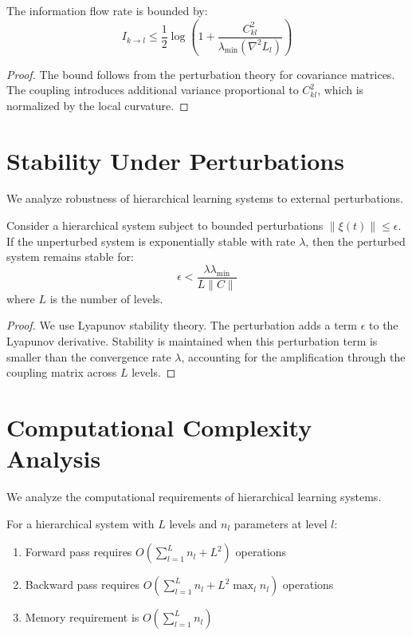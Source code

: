 \begin{theorem}
\label{thm:information_flow_bounds}
The information flow rate is bounded by:
$$I_{k \to l} \leq \frac{1}{2}\log\left(1 + \frac{C_{kl}^2}{\lambda_{\min}(\nabla^2 L_l)}\right)$$
\end{theorem}

\begin{proof}
The bound follows from the perturbation theory for covariance matrices. The coupling introduces additional variance proportional to $C_{kl}^2$, which is normalized by the local curvature.
\end{proof}

\section{Stability Under Perturbations}

We analyze robustness of hierarchical learning systems to external perturbations.

\begin{theorem}
\label{thm:perturbation_stability}
Consider a hierarchical system subject to bounded perturbations $\|\xi(t)\| \leq \epsilon$. If the unperturbed system is exponentially stable with rate $\lambda$, then the perturbed system remains stable for:
$$\epsilon < \frac{\lambda \lambda_{\min}}{L \|C\|}$$
where $L$ is the number of levels.
\end{theorem}

\begin{proof}
We use Lyapunov stability theory. The perturbation adds a term $\epsilon$ to the Lyapunov derivative. Stability is maintained when this perturbation term is smaller than the convergence rate $\lambda$, accounting for the amplification through the coupling matrix across $L$ levels.
\end{proof}

\section{Computational Complexity Analysis}

We analyze the computational requirements of hierarchical learning systems.

\begin{theorem}
\label{thm:computational_complexity}
For a hierarchical system with $L$ levels and $n_l$ parameters at level $l$:
\begin{enumerate}
\item Forward pass requires $O(\sum_{l=1}^L n_l + L^2)$ operations
\item Backward pass requires $O(\sum_{l=1}^L n_l + L^2 \max_l n_l)$ operations
\item Memory requirement is $O(\sum_{l=1}^L n_l)$
\end{enumerate}
\end{theorem}

